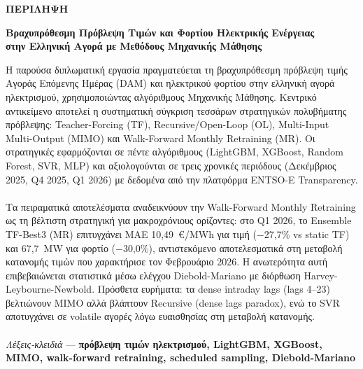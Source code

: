 \begin{center}  \Large{\textbf{ΠΕΡΙΛΗΨΗ}}  \end{center}
\begin{center}  \Large{\textbf{Βραχυπρόθεσμη Πρόβλεψη Τιμών και Φορτίου Ηλεκτρικής Ενέργειας\\
στην Ελληνική Αγορά με Μεθόδους Μηχανικής Μάθησης}}  \end{center}
\vspace{3pt}
\vspace{10pt}
\noindent
Η παρούσα διπλωματική εργασία πραγματεύεται τη βραχυπρόθεσμη πρόβλεψη τιμής
Αγοράς Επόμενης Ημέρας (DAM) και ηλεκτρικού φορτίου στην ελληνική αγορά
ηλεκτρισμού, χρησιμοποιώντας αλγόριθμους Μηχανικής Μάθησης. Κεντρικό αντικείμενο
αποτελεί η συστηματική σύγκριση τεσσάρων στρατηγικών πολυβήματης πρόβλεψης:
Teacher-Forcing (TF), Recursive/Open-Loop (OL), Multi-Input Multi-Output (MIMO)
και Walk-Forward Monthly Retraining (MR). Οι στρατηγικές εφαρμόζονται σε πέντε
αλγόριθμους (LightGBM, XGBoost, Random Forest, SVR, MLP) και αξιολογούνται σε
τρεις χρονικές περιόδους (Δεκέμβριος 2025, Q4 2025, Q1 2026) με δεδομένα από
την πλατφόρμα ENTSO-E Transparency.\\\\
\noindent
Τα πειραματικά αποτελέσματα αναδεικνύουν την Walk-Forward Monthly Retraining ως
τη βέλτιστη στρατηγική για μακροχρόνιους ορίζοντες: στο Q1 2026, το Ensemble
TF-Best3 (MR) επιτυγχάνει MAE 10,49~€/MWh για τιμή (−27,7\% vs static TF) και
67,7~MW για φορτίο (−30,0\%), αντιστεκόμενο αποτελεσματικά στη μεταβολή
κατανομής τιμών που χαρακτήρισε τον Φεβρουάριο 2026. Η ανωτερότητα αυτή
επιβεβαιώνεται στατιστικά μέσω ελέγχου Diebold-Mariano με διόρθωση
Harvey-Leybourne-Newbold. Πρόσθετα ευρήματα: τα dense intraday lags (lags 4--23)
βελτιώνουν MIMO αλλά βλάπτουν Recursive (dense lags paradox), ενώ το SVR
αποτυγχάνει σε volatile αγορές λόγω ευαισθησίας στη μεταβολή κατανομής.\\
\vspace{0.3cm}
\\ \textit{Λέξεις-κλειδιά} --- \textbf{πρόβλεψη τιμών ηλεκτρισμού, LightGBM, XGBoost, MIMO, walk-forward retraining, scheduled sampling, Diebold-Mariano}
